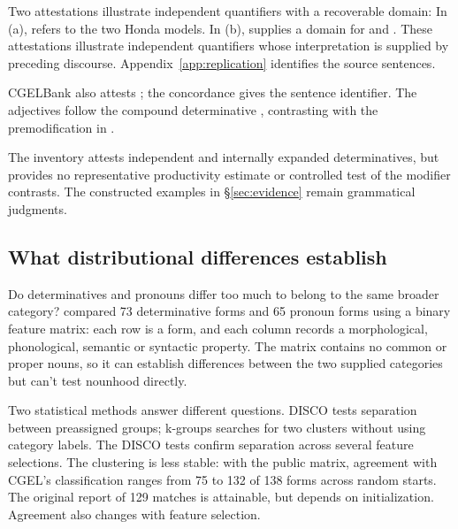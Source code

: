 \documentclass[12pt]{article}
\begin{document}
Two attestations illustrate independent quantifiers with a recoverable domain:
\ea\label{ex:attested-quantifiers}
\ea {}
\ex {}
\z\z
In (a),  refers to the two Honda models. In (b),  supplies a domain for  and . These attestations illustrate independent quantifiers whose interpretation is supplied by preceding discourse. Appendix~\ref{app:replication} identifies the source sentences.

CGELBank also attests ; the concordance gives the sentence identifier. The adjectives follow the compound determinative , contrasting with the premodification in .

The inventory attests independent and internally expanded determinatives, but provides no representative productivity estimate or controlled test of the modifier contrasts. The constructed examples in §\ref{sec:evidence} remain grammatical judgments.

\subsection{What distributional differences establish}

Do determinatives and pronouns differ too much to belong to the same broader category? \textcite{reynolds2021} compared 73 determinative forms and 65 pronoun forms using a binary feature matrix: each row is a form, and each column records a morphological, phonological, semantic or syntactic property. The matrix contains no common or proper nouns, so it can establish differences between the two supplied categories but can't test nounhood directly.

Two statistical methods answer different questions. DISCO tests separation between preassigned groups; k-groups searches for two clusters without using category labels. The DISCO tests confirm separation across several feature selections. The clustering is less stable: with the public matrix, agreement with CGEL's classification ranges from 75 to 132 of 138 forms across random starts. The original report of 129 matches is attainable, but depends on initialization. Agreement also changes with feature selection.
\end{document}
